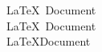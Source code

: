 \documentclass{article}
\begin{document}
    \begin{doublespace}
        \lipsum[1-2]
    \end{doublespace}
    
    \begin{spacing}{1.5}
        \lipsum[1-2]
    \end{spacing}
    \lipsum[1-2]

    \pagebreak

    \lipsum[2-2]
    \smallskip

    \lipsum[2-2]
    \medskip

    \lipsum[2-2]
    \bigskip

    \lipsum[2-2]
    \vspace{20pt}

    \lipsum[2-2]

    \pagebreak

    \lipsum[2-2]
    \vfill
    
    \lipsum[2-2]
    \vfill

    \lipsum[2-2]

    \pagebreak

    \noindent
    \LaTeX \ Document \\
    \LaTeX \, Document \\
    \LaTeX \hfill Document \\
\end{document}
